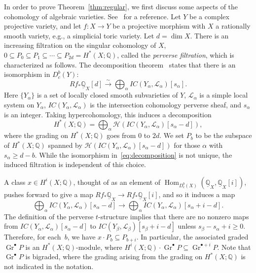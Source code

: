 \documentclass[11pt]{article}
\theoremstyle{definition}
\numberwithin{equation}{section}
\numberwithin{equation}{section}
\begin{document}
In order to prove Theorem~\ref{thm:regular}, we first discuss some aspects of the cohomology of algebraic varieties. See~\cite{dCM} for a reference. 
Let $Y$ be a complex projective variety, and let $f \colon X \to Y$ be a projective morphism with $X$ a rationally smooth variety, e.g., a simplicial toric variety. Let $d = \dim X$. There is an increasing filtration on the singular cohomology of $X$, $0 \subseteq P_0 \subseteq P_1 \subseteq \dotsb \subseteq P_{2d} = H^*(X; \mathbb{Q})$, called the \emph{perverse filtration}, which is characterized as follows. The decomposition theorem~\cite{BBDG} states that there is an isomorphism in $D^b_c(Y)$:
\begin{equation}\label{eq:decomposition}
Rf_* \underline{\mathbb{Q}}_X[d] \stackrel{\sim}{\to} \bigoplus_{\alpha} IC(Y_{\alpha}, \mathcal{L}_{\alpha})[s_{\alpha}].
\end{equation}
Here $\{Y_{\alpha}\}$ is a set of locally closed smooth subvarieties of $Y$, $\mathcal{L}_{\alpha}$ is a simple local system on $Y_{\alpha}$, $IC(Y_{\alpha}, \mathcal{L}_{\alpha})$ is the intersection cohomology perverse sheaf, and $s_{\alpha}$ is an integer. Taking hypercohomology, this induces a decomposition
$$H^*(X; \mathbb{Q}) = \bigoplus_{\alpha} \mathcal{H}(IC(Y_{\alpha}, \mathcal{L}_{\alpha})[s_{\alpha} - d]),$$
where the grading on $H^*(X; \mathbb{Q})$ goes from $0$ to $2d$. 
We set $P_b$ to be the subspace of $H^*(X; \mathbb{Q})$ spanned by $\mathcal{H}(IC(Y_{\alpha}, \mathcal{L}_{\alpha})[s_{\alpha} - d])$ for those $\alpha$ with $s_{\alpha} \ge d - b$.  While the isomorphism in~\eqref{eq:decomposition} is not unique, the induced filtration is independent of this choice. 

A class $x \in H^i(X; \mathbb{Q})$, thought of as an element of $\operatorname{Hom}_{D^b_c(X)}(\underline{\mathbb{Q}}_X, \underline{\mathbb{Q}}_X[i])$, pushes forward to give a map $Rf_* \underline{\mathbb{Q}}_X \to Rf_* \underline{\mathbb{Q}}_X[i]$, and so it induces a map
$$\bigoplus_{\alpha} IC(Y_{\alpha}, \mathcal{L}_{\alpha})[s_{\alpha} - d] \to \bigoplus_{\alpha} IC(Y_{\alpha}, \mathcal{L}_{\alpha})[s_{\alpha} + i - d].$$
The definition of the perverse $t$-structure implies that there are no nonzero maps from $IC(Y_{\alpha}, \mathcal{L}_{\alpha})[s_{\alpha} - d]$ to $IC(Y_{\beta}, \mathcal{L}_{\beta})[s_{\beta} + i - d]$ unless $s_{\beta} - s_{\alpha} + i \ge 0$. Therefore, for each~$b$, we have $x \cdot P_b \subseteq P_{b + i}$. In particular, the associated graded $\operatorname{Gr}^{\bullet} P$ is an $H^*(X; \mathbb{Q})$-module, where $H^i(X; \mathbb{Q}) \cdot \operatorname{Gr}^{\bullet} P \subseteq \operatorname{Gr}^{\bullet + i} P$. Note that $\operatorname{Gr}^{\bullet} P$ is bigraded, where the grading arising from the grading on $H^*(X; \mathbb{Q})$ is not indicated in the notation. 
\end{document}
